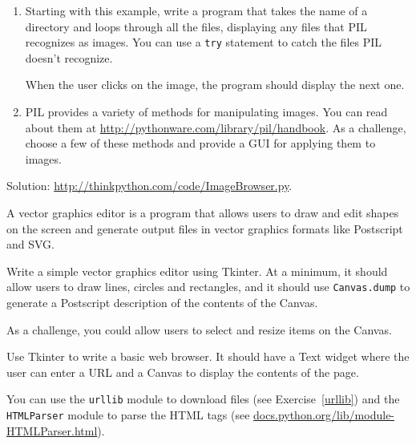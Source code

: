 \documentclass[10pt]{book}
\begin{document}
\begin{CJK}{UTF8}{gbsn}
\begin{exercise}
\begin{enumerate}
\item Starting with this example, write a program that takes
the name of a directory and loops through all the files, displaying
any files that PIL recognizes as images.  You can use a {\tt try}
statement to catch the files PIL doesn't recognize.

When the user clicks on the image, the program should display the next one.

\item PIL provides a variety of methods for manipulating images.
You can read about them at \url{http://pythonware.com/library/pil/handbook}.
As a challenge, choose a few of these methods and provide a
GUI for applying them to images.

\end{enumerate}

Solution: \url{http://thinkpython.com/code/ImageBrowser.py}.

\end{exercise}


\begin{exercise}

A vector graphics editor is a program that allows users to draw and
edit shapes on the screen and generate output files in vector graphics
formats like Postscript and SVG.

Write a simple vector graphics editor using Tkinter.  At a
minimum, it should allow users to draw lines, circles and
rectangles, and it should use {\tt Canvas.dump} to
generate a Postscript description of the contents of the
Canvas.

As a challenge, you could allow users to select and resize
items on the Canvas.


\end{exercise}


\begin{exercise}

Use Tkinter to write a basic web browser.  It
should have a Text widget where the user can enter a URL
and a Canvas to display the contents of the page.

You can use the {\tt urllib} module to download files
(see Exercise~\ref{urllib}) and
the {\tt HTMLParser} module to parse the HTML
tags (see \url{docs.python.org/lib/module-HTMLParser.html}).


\end{exercise}
\end{CJK}
\end{document}
